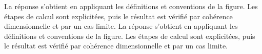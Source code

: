 \begin{corrigebox}
\begin{marginfigure}

\end{marginfigure}
La réponse s'obtient en appliquant les définitions et conventions de la
    figure. Les étapes de calcul sont explicitées, puis le résultat est vérifié par
    cohérence dimensionnelle et par un cas limite.
La réponse s'obtient en appliquant les définitions et conventions de la
    figure. Les étapes de calcul sont explicitées, puis le résultat est vérifié par
    cohérence dimensionnelle et par un cas limite.
\end{corrigebox}
